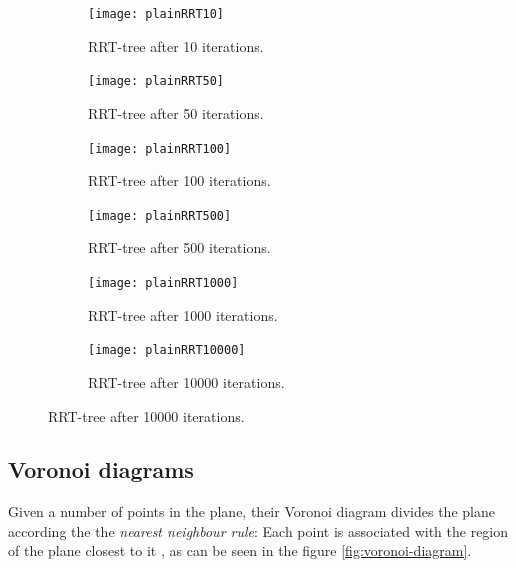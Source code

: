 \begin{figure}
  \label{fig:rrt-expansion}
  \centering
  \begin{subfigure}[b]{0.3\textwidth}
    \texttt{[image: plainRRT10]}
    \caption{RRT-tree after 10 iterations.}
  \end{subfigure}
  \begin{subfigure}[b]{0.3\textwidth}
    \texttt{[image: plainRRT50]}
    \caption{RRT-tree after 50 iterations.}
  \end{subfigure}
  \begin{subfigure}[b]{0.3\textwidth}
    \texttt{[image: plainRRT100]}
    \caption{RRT-tree after 100 iterations.}
  \end{subfigure}
  \newline %
  \begin{subfigure}[b]{0.3\textwidth}
    \texttt{[image: plainRRT500]}
    \caption{RRT-tree after 500 iterations.}
  \end{subfigure}
  \begin{subfigure}[b]{0.3\textwidth}
    \texttt{[image: plainRRT1000]}
    \caption{RRT-tree after 1000 iterations.}
  \end{subfigure}
  \begin{subfigure}[b]{0.3\textwidth}
    \texttt{[image: plainRRT10000]}
    \caption{RRT-tree after 10000 iterations.}
  \end{subfigure}
\end{figure}

\subsection{Voronoi diagrams}
\label{subsec:voronoi regions}

Given a number of points in the plane, their Voronoi diagram divides the plane
according the the \textit{nearest neighbour rule}: Each point is associated with
the region of the plane closest to it
\cite{aurenhammerVoronoiDiagramsSurvey1991}, as can be seen in the figure
\ref{fig:voronoi-diagram}.


